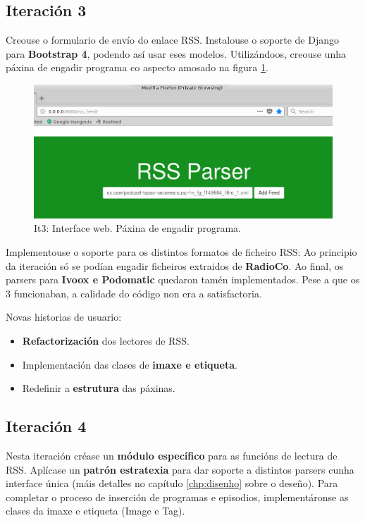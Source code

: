 \subsection{Iteración 3}

Creouse o formulario de envío do enlace RSS. Instalouse o soporte de Django para \textbf{Bootstrap 4}, podendo así usar eses modelos. Utilizándoos, creouse unha páxina de engadir programa co aspecto amosado na figura \ref{fig:it3_add_program}.

\begin{figure}[h]
	\centering
	\includegraphics[scale=0.5,keepaspectratio=true]{./images/it3_add_program.png}
	\caption{It3: Interface web. Páxina de engadir programa.}
	\label{fig:it3_add_program}
\end{figure}

Implementouse o soporte para os distintos formatos de ficheiro RSS: Ao principio da iteración só se podían engadir ficheiros extraidos de \textbf{RadioCo}. Ao final, os parsers para \textbf{Ivoox e Podomatic} quedaron tamén implementados. Pese a que os 3 funcionaban, a calidade do código non era a satisfactoria.

Novas historias de usuario:

\begin{itemize}
	\item \textbf{Refactorización} dos lectores de RSS.
	\item Implementación das clases de \textbf{imaxe e etiqueta}.
	\item Redefinir a \textbf{estrutura} das páxinas. 
\end{itemize}


\subsection{Iteración 4}

Nesta iteración créase un \textbf{módulo específico} para as funcións de lectura de RSS. Aplícase un \textbf{patrón estratexia} para dar soporte a distintos parsers cunha interface única (máis detalles no capítulo \ref{chp:disenho} sobre o deseño). Para completar o proceso de inserción de programas e episodios, implementáronse as clases da imaxe e etiqueta (Image e Tag).

